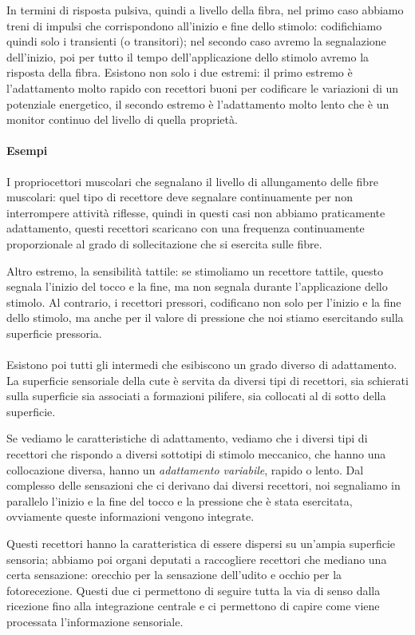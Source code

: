 \documentclass[a4paper,12pt]{article}
\begin{document}
In termini di risposta pulsiva, quindi a livello della fibra, nel primo caso abbiamo treni di impulsi che corrispondono all'inizio e fine dello stimolo: codifichiamo quindi solo i transienti (o transitori); nel secondo caso avremo la segnalazione dell'inizio, poi per tutto il tempo dell'applicazione dello stimolo avremo la risposta della fibra. Esistono non solo i due estremi: il primo estremo è l'adattamento molto rapido con recettori buoni per codificare le variazioni di un potenziale energetico, il secondo estremo è l'adattamento molto lento che è un monitor continuo del livello di quella proprietà. 

\paragraph{Esempi} I propriocettori muscolari che segnalano il livello di allungamento delle fibre muscolari: quel tipo di recettore deve segnalare continuamente per non interrompere attività riflesse, quindi in questi casi non abbiamo praticamente adattamento, questi recettori scaricano con una frequenza continuamente proporzionale al grado di sollecitazione che si esercita sulle fibre. 

Altro estremo, la sensibilità tattile: se stimoliamo un recettore tattile, questo segnala l'inizio del tocco e la fine, ma non segnala durante l'applicazione dello stimolo. Al contrario, i recettori pressori, codificano non solo per l'inizio e la fine dello stimolo, ma anche per il valore di pressione che noi stiamo esercitando sulla superficie pressoria.
\paragraph{}
Esistono poi tutti gli intermedi che esibiscono un grado diverso di adattamento. La superficie sensoriale della cute è servita da diversi tipi di recettori, sia schierati sulla superficie sia associati a formazioni pilifere, sia collocati al di sotto della superficie.
  
Se vediamo le caratteristiche di adattamento, vediamo che i diversi tipi di recettori che rispondo a diversi sottotipi di stimolo meccanico, che hanno una collocazione diversa, hanno un \emph{adattamento variabile}, rapido o lento. Dal complesso delle sensazioni che ci derivano dai diversi recettori, noi segnaliamo in parallelo l'inizio e la fine del tocco e la pressione che è stata esercitata, ovviamente queste informazioni vengono integrate. 

Questi recettori hanno la caratteristica di essere dispersi su un'ampia superficie sensoria; abbiamo poi organi deputati a raccogliere recettori che mediano una certa sensazione: orecchio per la sensazione dell'udito e occhio per la fotorecezione. Questi due ci permettono di seguire tutta la via di senso dalla ricezione fino alla integrazione centrale e ci permettono di capire come viene processata l'informazione sensoriale. 
\end{document}

